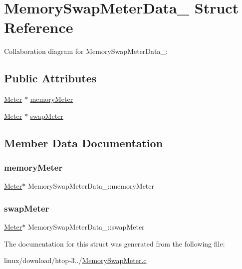 \hypertarget{structMemorySwapMeterData__}{}\section{Memory\+Swap\+Meter\+Data\+\_\+ Struct Reference}
\label{structMemorySwapMeterData__}


Collaboration diagram for Memory\+Swap\+Meter\+Data\+\_\+\+:
\subsection*{Public Attributes}
\begin{DoxyCompactItemize}
\item 
\hyperlink{Meter_8h_a36b2163502d1e0b7025c80f102390da2}{Meter} $\ast$ \hyperlink{structMemorySwapMeterData___a5fa7b1effd7905a5775c539c32a9bb79}{memory\+Meter}
\item 
\hyperlink{Meter_8h_a36b2163502d1e0b7025c80f102390da2}{Meter} $\ast$ \hyperlink{structMemorySwapMeterData___a86bc5299a4c95d4f2199c795ccd9a767}{swap\+Meter}
\end{DoxyCompactItemize}


\subsection{Member Data Documentation}
\mbox{\label{structMemorySwapMeterData___a5fa7b1effd7905a5775c539c32a9bb79}} 
\subsubsection{\texorpdfstring{memory\+Meter}{memoryMeter}}
{\footnotesize\ttfamily \hyperlink{Meter_8h_a36b2163502d1e0b7025c80f102390da2}{Meter}$\ast$ Memory\+Swap\+Meter\+Data\+\_\+\+::memory\+Meter}

\mbox{\label{structMemorySwapMeterData___a86bc5299a4c95d4f2199c795ccd9a767}} 
\subsubsection{\texorpdfstring{swap\+Meter}{swapMeter}}
{\footnotesize\ttfamily \hyperlink{Meter_8h_a36b2163502d1e0b7025c80f102390da2}{Meter}$\ast$ Memory\+Swap\+Meter\+Data\+\_\+\+::swap\+Meter}



The documentation for this struct was generated from the following file\+:\begin{DoxyCompactItemize}
\item 
linux/download/htop-\/3../\hyperlink{MemorySwapMeter_8c}{Memory\+Swap\+Meter.\+c}\end{DoxyCompactItemize}
